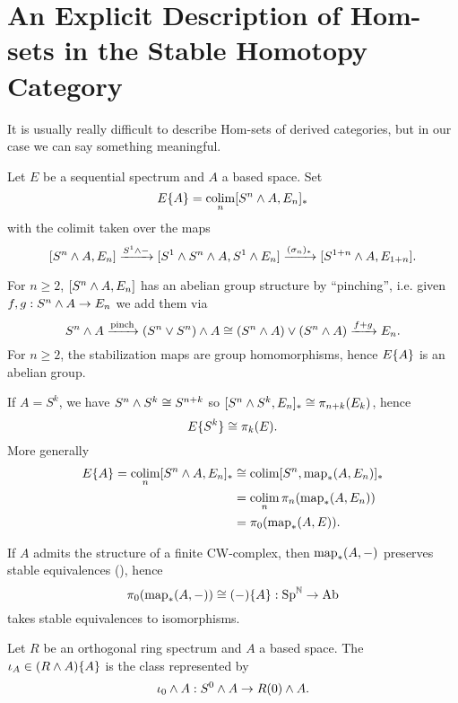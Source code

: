 
\section{An Explicit Description of Hom-sets in the Stable Homotopy Category}


It is usually really difficult to describe Hom-sets of derived categories, but in our case we can say something meaningful.

\begin{construction}
Let $E$ be a sequential spectrum and $A$ a based space. Set
\[E\{A\}=\operatorname*{colim}_n[S^n\wedge A,E_n]_*\]
with the colimit taken over the maps
\[[S^n\wedge A,E_n]\xrightarrow{S^1\wedge-}[S^1\wedge S^n\wedge A,S^1\wedge E_n]\xrightarrow{(\sigma_n)_*}[S^{1+n}\wedge A,E_{1+n}].\]
\end{construction}

\begin{remark}
For $n\geq2$, $[S^n\wedge A,E_n]$ has an abelian group structure by \enquote{pinching}, i.e. given $f,g:S^n\wedge A\to E_n$ we add them via
\[S^n\wedge A\xrightarrow{\text{pinch}}(S^n\vee S^n)\wedge A\cong(S^n\wedge A)\vee(S^n\wedge A)\xrightarrow{f+g}E_n.\]
For $n\geq2$, the stabilization maps are group homomorphisms, hence $E\{A\}$ is an abelian group.
\end{remark}

\begin{remark}
If $A=S^k$, we have $S^n\wedge S^k\cong S^{n+k}$ so $[S^n\wedge S^k,E_n]_*\cong\pi_{n+k}(E_k)$, hence
\[E\{S^k\}\cong\pi_k(E).\]
More generally
\begin{align*}
    E\{A\}=\operatorname*{colim}_n[S^n\wedge A,E_n]_*&\cong\operatorname*{colim}[S^n,\operatorname{map}_*(A,E_n)]_*\\
    &=\operatorname*{colim}_n\pi_n(\operatorname{map}_*(A,E_n))\\
    &=\pi_0(\operatorname{map}_*(A,E)).
\end{align*}
\end{remark}

If $A$ admits the structure of a finite CW-complex, then $\operatorname{map}_*(A,-)$ preserves stable equivalences (), hence
\[\pi_0(\operatorname{map}_*(A,-))\cong(-)\{A\}:{\normalfont\textup{Sp}}^{\mathbb N}\to{\normalfont\textup{Ab}}\]
takes stable equivalences to isomorphisms.

\begin{definition}
Let $R$ be an orthogonal ring spectrum and $A$ a based space. The  $\iota_A\in (R\wedge A)\{A\}$ is the class represented by
\[\iota_0\wedge A:S^0\wedge A\to R(0)\wedge A.\]
\end{definition}

